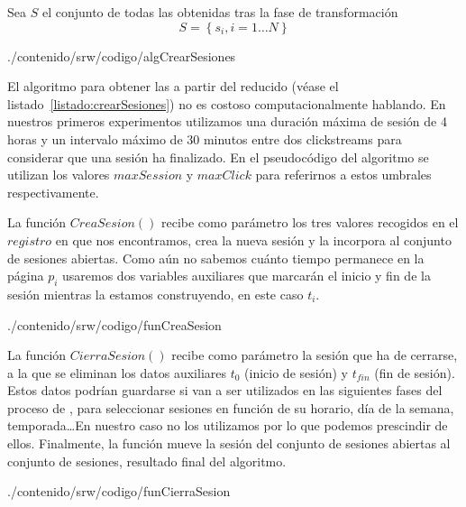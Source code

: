 \begin{Definition}\label{def:1-2-4-cjto-sesion}
  Sea $S$ el conjunto de todas las \sns obtenidas tras la fase de transformación
  \begin{equation}\label{eq:1-2-4-cjto-sesiones}
    S = \left\{s_i, i = 1\ldots N\right\}
  \end{equation}
\end{Definition}


                       {./contenido/srw/codigo/algCrearSesiones}

El algoritmo para obtener las \sns a partir del \flog reducido (véase el listado~\ref{listado:crearSesiones}) no es costoso computacionalmente hablando. En nuestros primeros experimentos utilizamos una duración máxima de sesión de 4 horas y un intervalo máximo de 30 minutos entre dos clickstreams para considerar que una sesión ha finalizado. En el pseudocódigo del algoritmo se utilizan los valores $maxSession$ y $maxClick$ para referirnos a estos umbrales respectivamente.

La función $CreaSesion()$ recibe como parámetro los tres valores recogidos en el $registro$ en que nos encontramos, crea la nueva sesión y la incorpora al conjunto de sesiones abiertas. Como aún no sabemos cuánto tiempo permanece en la página $p_i$ usaremos dos variables auxiliares que marcarán el inicio y fin de la sesión mientras la estamos construyendo, en este caso $t_i$.


                       {./contenido/srw/codigo/funCreaSesion}

La función $CierraSesion()$ recibe como parámetro la sesión que ha de cerrarse, a la que se eliminan los datos auxiliares $t_0$ (inicio de sesión) y $t_{fin}$ (fin de sesión). Estos datos podrían guardarse si van a ser utilizados en las siguientes fases del proceso de \WUM, para seleccionar sesiones en función de su horario, día de la semana, temporada\ldots En nuestro caso no los utilizamos por lo que podemos prescindir de ellos. Finalmente, la función mueve la sesión del conjunto de sesiones abiertas al conjunto de sesiones, resultado final del algoritmo.


                       {./contenido/srw/codigo/funCierraSesion}

